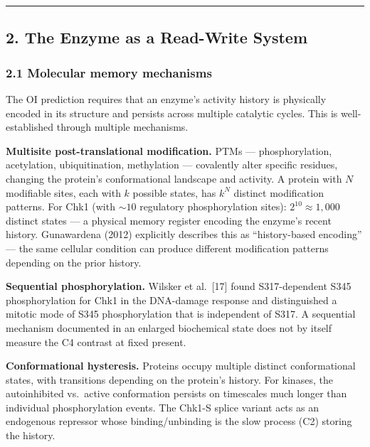 \documentclass[
]{article}
\begin{document}
\begin{center}\rule{0.5\linewidth}{0.5pt}\end{center}

\hypertarget{the-enzyme-as-a-read-write-system}{%
\subsection{2. The Enzyme as a Read-Write
System}\label{the-enzyme-as-a-read-write-system}}

\hypertarget{molecular-memory-mechanisms}{%
\subsubsection{2.1 Molecular memory
mechanisms}\label{molecular-memory-mechanisms}}

The OI prediction requires that an enzyme's activity history is
physically encoded in its structure and persists across multiple
catalytic cycles. This is well-established through multiple mechanisms.

\textbf{Multisite post-translational modification.} PTMs ---
phosphorylation, acetylation, ubiquitination, methylation --- covalently
alter specific residues, changing the protein's conformational landscape
and activity. A protein with \(N\) modifiable sites, each with \(k\)
possible states, has \(k^N\) distinct modification patterns. For Chk1
(with \(\sim 10\) regulatory phosphorylation sites):
\(2^{10} \approx 1{,}000\) distinct states --- a physical memory
register encoding the enzyme's recent history. Gunawardena (2012)
explicitly describes this as ``history-based encoding'' --- the same
cellular condition can produce different modification patterns depending
on the prior history.

\textbf{Sequential phosphorylation.} Wilsker et al.~{[}17{]} found
S317-dependent S345 phosphorylation for Chk1 in the DNA-damage response
and distinguished a mitotic mode of S345 phosphorylation that is
independent of S317. A sequential mechanism documented in an enlarged
biochemical state does not by itself measure the C4 contrast at fixed
present.

\textbf{Conformational hysteresis.} Proteins occupy multiple distinct
conformational states, with transitions depending on the protein's
history. For kinases, the autoinhibited vs.~active conformation persists
on timescales much longer than individual phosphorylation events. The
Chk1-S splice variant acts as an endogenous repressor whose
binding/unbinding is the slow process (C2) storing the history.
\end{document}

